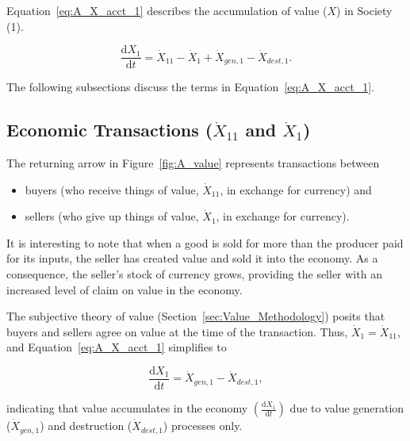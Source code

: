Equation~\ref{eq:A_X_acct_1} describes the accumulation 
of value
($X$) in Society (1).

\begin{equation} \label{eq:A_X_acct_1}
	\frac{\mathrm{d}X_{1}}{\mathrm{d}t} 
	= \dot{X}_{11} 
	- \dot{X}_{1}
	+ \dot{X}_{gen,1}
	- \dot{X}_{dest,1}.
\end{equation}

\noindent{} The following subsections discuss the terms in Equation~\ref{eq:A_X_acct_1}.


\subsection{Economic Transactions ($\dot{X}_{11}$ and $\dot{X}_{1}$)}

The returning arrow in Figure~\ref{fig:A_value} 
represents transactions between 
\begin{itemize}
	\item{buyers (who receive things of value, $\dot{X}_{11}$,
	in exchange for currency) and}
	\item{sellers (who give up things of value, $\dot{X}_{1}$,
	in exchange for currency).}
\end{itemize}

It is interesting to note that when a good is sold for more
than the producer paid for its inputs, 
the seller has created value and sold it into the economy. 
As a consequence, the seller's stock of currency grows,
providing the seller with an increased level of claim 
on value in the economy.

The subjective theory of value
(Section~\ref{sec:Value_Methodology})
posits that buyers and sellers agree on value at the 
time of the transaction.
Thus, $\dot{X}_{1} = \dot{X}_{11}$, and Equation~\ref{eq:A_X_acct_1}
simplifies to

\begin{equation} \label{eq:A_X_acct_2}	
	\frac{\mathrm{d}X_{1}}{\mathrm{d}t}	
	= \dot{X}_{gen,1}
	- \dot{X}_{dest,1},
\end{equation}

\noindent{}indicating that value accumulates in the economy
$\left( \frac{\mathrm{d}X_{1}}{\mathrm{d}t} \right)$
due to value generation ($\dot{X}_{gen,1}$) 
and destruction ($\dot{X}_{dest,1}$) processes only.



